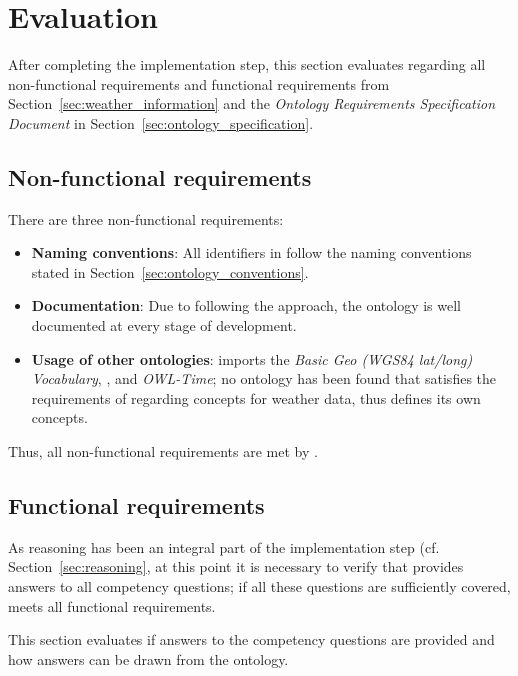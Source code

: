 \section{Evaluation}
\label{sec:ontology_evaluation}

After completing the implementation step, this section evaluates \smarthomeweather regarding all non-functional requirements and functional requirements from Section~\ref{sec:weather_information} and the \emph{Ontology Requirements Specification Document} in Section~\ref{sec:ontology_specification}.

\subsection{Non-functional requirements}
\label{sec:evaluation_non_functional}

There are three non-functional requirements:

\begin{itemize}
  \item \textbf{Naming conventions}: All identifiers in \smarthomeweather follow the naming conventions stated in Section~\ref{sec:ontology_conventions}.
  \item \textbf{Documentation}: Due to following the \methontology approach, the ontology is well documented at every stage of development.
  \item \textbf{Usage of other ontologies}: \smarthomeweather imports the \emph{Basic Geo (WGS84 lat/long) Vocabulary}, \muo, and \emph{OWL-Time}; no ontology has been found that satisfies the requirements of \smarthomeweather regarding concepts for weather data, thus \smarthomeweather defines its own concepts.
\end{itemize}

Thus, all non-functional requirements are met by \smarthomeweather.

\subsection{Functional requirements}
\label{sec:evaluation_functional}

As  reasoning has been an integral part of the implementation step (cf. Section~\ref{sec:reasoning}, at this point it is necessary to verify that \smarthomeweather provides answers to all competency questions; if all these questions are sufficiently covered, \smarthomeweather meets all functional requirements.

This section evaluates if answers to the competency questions are provided and how answers can be drawn from the ontology.

